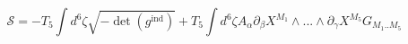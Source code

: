 \begin{equation}
\mathcal{S}=-T_{5}\int d^{6}\zeta \sqrt{-\det (g^{\mathrm{ind}})}+T_{5}\int
d^{6}\zeta A_{\alpha }\partial _{\beta }X^{M_{1}}\wedge ...\wedge \partial
_{\gamma }X^{M_{5}}G_{M_{1}..M_{5}}  \label{d5action}
\end{equation}

